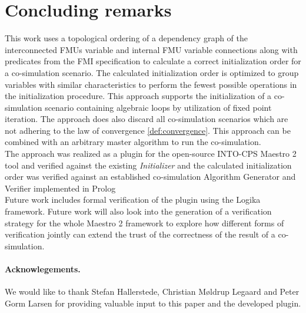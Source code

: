 \section{Concluding remarks}\label{sc:summary}
This work uses a topological ordering of a dependency graph of the interconnected FMUs variable and internal FMU variable connections along with predicates from the FMI specification to calculate a correct initialization order for a co-simulation scenario. The calculated initialization order is optimized to group variables with similar characteristics to perform the fewest possible operations in the initialization procedure.
This approach supports the initialization of a co-simulation scenario containing algebraic loops by utilization of fixed point iteration. The approach does also discard all co-simulation scenarios which are not adhering to the law of convergence \ref{def:convergence}.
This approach can be combined with an arbitrary master algorithm to run the co-simulation. \\
The approach was realized as a plugin for the open-source INTO-CPS Maestro 2 tool and verified against the existing \textit{Initializer} and the calculated initialization order was verified against an established co-simulation Algorithm Generator and Verifier implemented in Prolog\cite{gomes_lucio_vangheluwe_2019}\\
Future work includes formal verification of the plugin using the Logika framework\cite{inbook}.
Future work will also look into the generation of a verification strategy for the whole Maestro 2 framework to explore how different forms of verification jointly can extend the trust of the correctness of the result of a co-simulation. 

\paragraph*{\textbf{Acknowlegements.}}We would like to thank Stefan Hallerstede, Christian Møldrup Legaard and Peter Gorm Larsen for providing valuable input to this paper and the developed plugin.